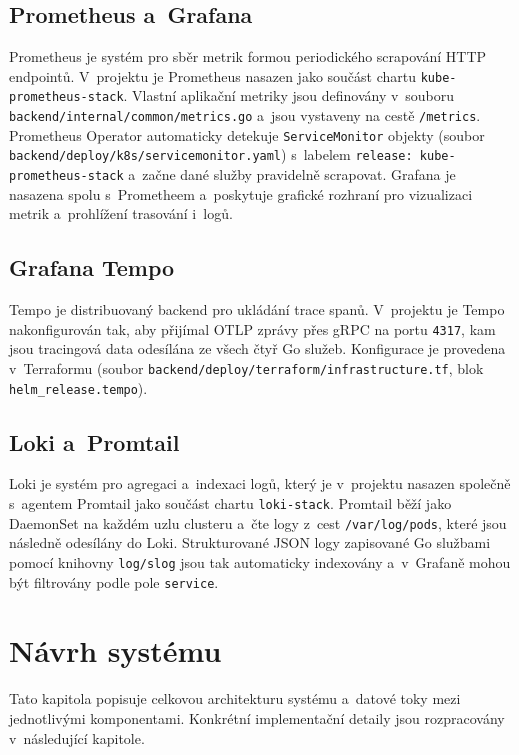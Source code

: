 \documentclass[11pt, a4paper, oneside]{article}
\begin{document}
\subsection{Prometheus a~Grafana}

Prometheus je systém pro sběr metrik formou periodického scrapování HTTP endpointů. V~projektu je Prometheus nasazen jako součást chartu \texttt{kube-prometheus-stack}. Vlastní aplikační metriky jsou definovány v~souboru \texttt{backend/internal/common/metrics.go} a~jsou vystaveny na cestě \texttt{/metrics}. Prometheus Operator automaticky detekuje \texttt{ServiceMonitor} objekty (soubor \texttt{backend/deploy/k8s/servicemonitor.yaml}) s~labelem \texttt{release: kube-prometheus-stack} a~začne dané služby pravidelně scrapovat. Grafana je nasazena spolu s~Prometheem a~poskytuje grafické rozhraní pro vizualizaci metrik a~prohlížení trasování i~logů.

\subsection{Grafana Tempo}

Tempo je distribuovaný backend pro ukládání trace spanů. V~projektu je Tempo nakonfigurován tak, aby přijímal OTLP zprávy přes gRPC na portu \texttt{4317}, kam jsou tracingová data odesílána ze všech čtyř Go služeb. Konfigurace je provedena v~Terraformu (soubor \texttt{backend/deploy/terraform/infrastructure.tf}, blok \texttt{helm\_release.tempo}).

\subsection{Loki a~Promtail}

Loki je systém pro agregaci a~indexaci logů, který je v~projektu nasazen společně s~agentem Promtail jako součást chartu \texttt{loki-stack}. Promtail běží jako DaemonSet na každém uzlu clusteru a~čte logy z~cest \texttt{/var/log/pods}, které jsou následně odesílány do Loki. Strukturované JSON logy zapisované Go službami pomocí knihovny \texttt{log/slog} jsou tak automaticky indexovány a~v~Grafaně mohou být filtrovány podle pole \texttt{service}.

\clearpage
\section{Návrh systému}

Tato kapitola popisuje celkovou architekturu systému a~datové toky mezi jednotlivými komponentami. Konkrétní implementační detaily jsou rozpracovány v~následující kapitole.
\end{document}
